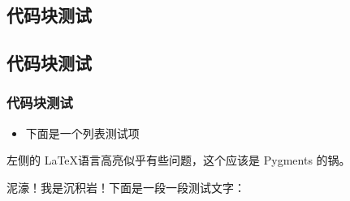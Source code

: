 \begin{multicols*}{2}
\section{ 代码块测试}

\subsection{ 代码块测试}

\subsubsection{ 代码块测试}



\begin{itemize}

\item 下面是一个列表测试项



\end{itemize}

左侧的 \LaTeX 语言高亮似乎有些问题，这个应该是 Pygments 的锅\rlap。




泥濠！我是沉积岩！下面是一段一段测试文字：%
\codeinline[haskell]{lst = [x| x <- }
\codeinline[haskell]{['a'..'g']] -- by 沉积岩}\ 
\end{multicols*}

\begin{multicols*}{3}

\end{multicols*}

\newpage